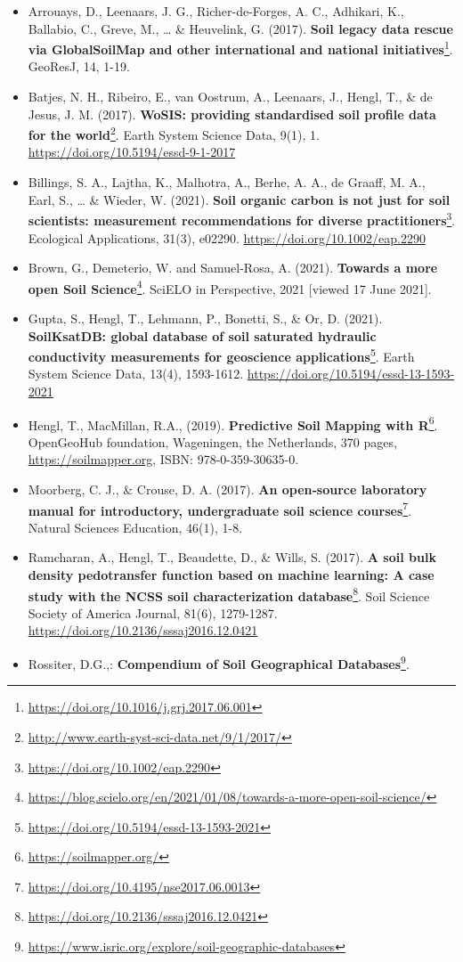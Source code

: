 \documentclass[
  graybox,natbib,nospthms]{svmono}
\providecommand{\tightlist}{%
  \setlength{\itemsep}{0pt}\setlength{\parskip}{0pt}}
\providecommand{\tightlist}{\setlength{\itemsep}{0pt}\setlength{\parskip}{0pt}}
\renewcommand{\href}[2]{#2 (\url{#1})}
\renewcommand{\href}[2]{#2\footnote{\url{#1}}}
\begin{document}
\begin{itemize}
\tightlist
\item
  Arrouays, D., Leenaars, J. G., Richer-de-Forges, A. C., Adhikari,
  K., Ballabio, C., Greve, M., \ldots{} \& Heuvelink, G. (2017). \href{https://doi.org/10.1016/j.grj.2017.06.001}{\textbf{Soil
  legacy data rescue via GlobalSoilMap and other international and
  national initiatives}}.
  GeoResJ, 14, 1-19.\\
\item
  Batjes, N. H., Ribeiro, E., van Oostrum, A., Leenaars, J., Hengl,
  T., \& de Jesus, J. M. (2017). \href{http://www.earth-syst-sci-data.net/9/1/2017/}{\textbf{WoSIS: providing standardised soil
  profile data for the world}}. Earth System Science Data, 9(1), 1. \url{https://doi.org/10.5194/essd-9-1-2017}~
\item
  Billings, S. A., Lajtha, K., Malhotra, A., Berhe, A. A., de Graaff, M. A.,
  Earl, S., \ldots{} \& Wieder, W. (2021). \href{https://doi.org/10.1002/eap.2290}{\textbf{Soil organic carbon is not just for soil
  scientists: measurement recommendations for diverse practitioners}}. Ecological
  Applications, 31(3), e02290. \url{https://doi.org/10.1002/eap.2290}\\
\item
  Brown, G., Demeterio, W. and Samuel-Rosa, A. (2021). \href{https://blog.scielo.org/en/2021/01/08/towards-a-more-open-soil-science/}{\textbf{Towards a more open Soil Science}}. SciELO in Perspective, 2021 {[}viewed 17 June 2021{]}.
\item
  Gupta, S., Hengl, T., Lehmann, P., Bonetti, S., \& Or, D. (2021). \href{https://doi.org/10.5194/essd-13-1593-2021}{\textbf{SoilKsatDB:
  global database of soil saturated hydraulic conductivity measurements for
  geoscience applications}}. Earth System Science Data, 13(4), 1593-1612.
  \url{https://doi.org/10.5194/essd-13-1593-2021}\\
\item
  Hengl, T., MacMillan, R.A., (2019). \href{https://soilmapper.org/}{\textbf{Predictive Soil Mapping with
  R}}. OpenGeoHub foundation, Wageningen, the
  Netherlands, 370 pages, \url{https://soilmapper.org}, ISBN:
  978-0-359-30635-0.\\
\item
  Moorberg, C. J., \& Crouse, D. A. (2017). \href{https://doi.org/10.4195/nse2017.06.0013}{\textbf{An open‐source laboratory manual for introductory, undergraduate soil science courses}}. Natural Sciences Education, 46(1), 1-8.\\
\item
  Ramcharan, A., Hengl, T., Beaudette, D., \& Wills, S. (2017). \href{https://doi.org/10.2136/sssaj2016.12.0421}{\textbf{A soil
  bulk density pedotransfer function based on machine learning: A case
  study with the NCSS soil characterization
  database}}. Soil Science
  Society of America Journal, 81(6), 1279-1287.
  \url{https://doi.org/10.2136/sssaj2016.12.0421}
\item
  Rossiter, D.G.,: \href{https://www.isric.org/explore/soil-geographic-databases}{\textbf{Compendium of Soil Geographical
  Databases}}.
\end{itemize}
\end{document}
